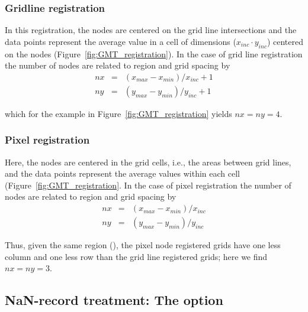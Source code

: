 \subsubsection{Gridline registration}

In this registration, the nodes are centered on the grid line
intersections and the data points represent the average value
in a cell of dimensions ($x_{inc} \cdot y_{inc}$) centered on the
nodes (Figure~\ref{fig:GMT_registration}).
In the case of grid line registration the number of nodes are
related to region and grid spacing by \\

\[ \begin{array}{ccl} 
nx & =  &       (x_{max} - x_{min}) / x_{inc} + 1       \\ 
ny & =  &       (y_{max} - y_{min}) / y_{inc} + 1
\end{array} \]

which for the example in Figure~\ref{fig:GMT_registration} yields $nx = ny = 4$.



\subsubsection{Pixel registration}

Here, the nodes are centered in the grid cells, i.e., the areas
between grid lines, and the data points represent the average
values within each cell (Figure~\ref{fig:GMT_registration}.
In the case of pixel registration the number of nodes are related
to region and grid spacing by \\

\[ \begin{array}{ccl} 
nx & =  &       (x_{max} - x_{min}) / x_{inc}   \\ 
ny & =  &       (y_{max} - y_{min}) / y_{inc}
\end{array} \]

Thus, given the same region (), the pixel node registered grids have one less
column and one less row than the grid line registered grids; here we
find $nx = ny = 3$.


\subsection{NaN-record treatment: The  option}

